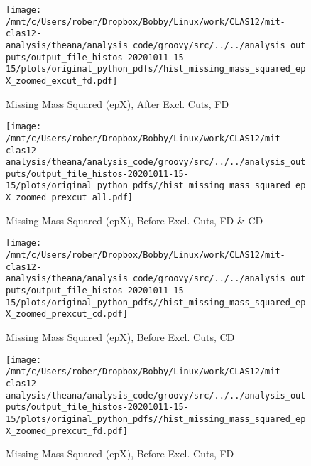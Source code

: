 \documentclass{article}
\begin{document}
\begin{landscape}
    \begin{figure}[h]
        \centering

        \texttt{[image: /mnt/c/Users/rober/Dropbox/Bobby/Linux/work/CLAS12/mit-clas12-analysis/theana/analysis\_code/groovy/src/../../analysis\_outputs/output\_file\_histos-20201011-15-15/plots/original\_python\_pdfs//hist\_missing\_mass\_squared\_epX\_zoomed\_excut\_fd.pdf]}
        \captionsetup{textformat=empty,labelformat=blank}
        \caption{Missing Mass Squared (epX), After Excl. Cuts, FD}
    \end{figure}
    \clearpage
    
    \begin{figure}[h]
        \centering

        \texttt{[image: /mnt/c/Users/rober/Dropbox/Bobby/Linux/work/CLAS12/mit-clas12-analysis/theana/analysis\_code/groovy/src/../../analysis\_outputs/output\_file\_histos-20201011-15-15/plots/original\_python\_pdfs//hist\_missing\_mass\_squared\_epX\_zoomed\_prexcut\_all.pdf]}
        \captionsetup{textformat=empty,labelformat=blank}
        \caption{Missing Mass Squared (epX), Before Excl. Cuts, FD \& CD}
    \end{figure}
    \clearpage
    
    \begin{figure}[h]
        \centering

        \texttt{[image: /mnt/c/Users/rober/Dropbox/Bobby/Linux/work/CLAS12/mit-clas12-analysis/theana/analysis\_code/groovy/src/../../analysis\_outputs/output\_file\_histos-20201011-15-15/plots/original\_python\_pdfs//hist\_missing\_mass\_squared\_epX\_zoomed\_prexcut\_cd.pdf]}
        \captionsetup{textformat=empty,labelformat=blank}
        \caption{Missing Mass Squared (epX), Before Excl. Cuts, CD}
    \end{figure}
    \clearpage
    
    \begin{figure}[h]
        \centering

        \texttt{[image: /mnt/c/Users/rober/Dropbox/Bobby/Linux/work/CLAS12/mit-clas12-analysis/theana/analysis\_code/groovy/src/../../analysis\_outputs/output\_file\_histos-20201011-15-15/plots/original\_python\_pdfs//hist\_missing\_mass\_squared\_epX\_zoomed\_prexcut\_fd.pdf]}
        \captionsetup{textformat=empty,labelformat=blank}
        \caption{Missing Mass Squared (epX), Before Excl. Cuts, FD}
    \end{figure}
    \clearpage
    
    \begin{figure}[h]
        \centering


\end{figure}
\end{landscape}
\end{document}
